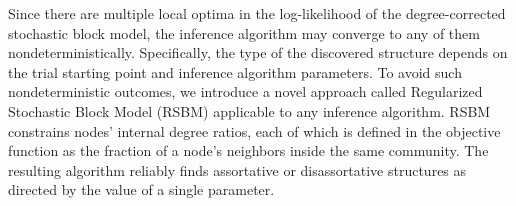 Since there are multiple local optima in the log-likelihood of the degree-corrected stochastic block model, the inference algorithm may converge to any of them nondeterministically. Specifically, the type of the discovered structure depends on the trial starting point and inference algorithm parameters. To avoid such nondeterministic outcomes, we introduce a novel approach called Regularized Stochastic Block Model (RSBM) applicable to any inference algorithm. RSBM constrains nodes' internal degree ratios, each of which is defined in the objective function as the fraction of a node's neighbors inside the same community. The resulting algorithm reliably finds assortative or disassortative structures as directed by the value of a single parameter. 


